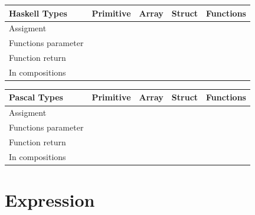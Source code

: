 \documentclass{article}
\newcommand{\cmark}{\ding{51}}
\newcommand{\xmark}{\ding{55}}
\begin{document}
\begin{table}[h!]
\centering
\begin{tabular}{|l|c c c c|}
\hline
\rowcolor[HTML]{67FD9A} 
{\color[HTML]{000000} \textbf{Haskell Types}} & {\color[HTML]{000000} Primitive} & {\color[HTML]{000000} Array} & {\color[HTML]{000000} Struct} & {\color[HTML]{000000} Functions} \\ \hline
Assigment                                     & \cmark            & \cmark        & \cmark         & \cmark            \\ \hline
Functions parameter                           & \cmark            & \cmark        & \cmark         & \cmark            \\ \hline
Function return                               & \cmark            & \cmark        & \cmark         & \cmark            \\ \hline
In compositions                               & \cmark            & \cmark        & \cmark         & \cmark            \\ \hline
\end{tabular}
\end{table}

\begin{table}[h!]
\centering
\begin{tabular}{|l|c c c c|}
\hline
\rowcolor[HTML]{FFCCC9} 
{\color[HTML]{000000} \textbf{Pascal Types}} & {\color[HTML]{000000} Primitive} & {\color[HTML]{000000} Array} & {\color[HTML]{000000} Struct} & {\color[HTML]{000000} Functions} \\ \hline
Assigment                                    & \cmark            & \cmark        & \cmark         & \xmark            \\ \hline
Functions parameter                          & \cmark            & \cmark        & \cmark         & \xmark            \\ \hline
Function return                              & \cmark            & \xmark        & \xmark         & \xmark            \\ \hline
In compositions                              & \cmark            & \cmark        & \cmark         & \xmark            \\ \hline
\end{tabular}
\end{table}


\section{Expression}
\end{document}
